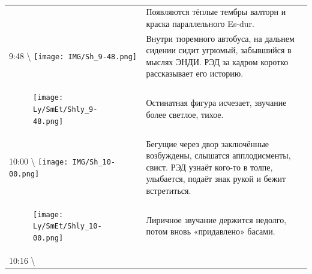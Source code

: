 \begin{longtable}[]{@{}ll@{}}
\begin{minipage}[t]{0.30\columnwidth}
\strut
\end{minipage} & \begin{minipage}[t]{0.64\columnwidth}\raggedright\strut
Появляются тёплые тембры валторн и краска параллельного
Es-dur.\strut
\end{minipage}\tabularnewline
\begin{minipage}[t]{0.30\columnwidth}\raggedright\strut
9:48 \textbackslash{}
\texttt{[image: IMG/Sh\_9-48.png]}\strut
\end{minipage} & \begin{minipage}[t]{0.64\columnwidth}\raggedright\strut
Внутри тюремного автобуса, на дальнем сидении сидит
угрюмый, забывшийся в мыслях ЭНДИ.
РЭД за кадром коротко рассказывает его историю.\strut
\end{minipage}\tabularnewline
\begin{minipage}[t]{0.30\columnwidth}\raggedright\strut
\begin{figure}
\centering
\texttt{[image: Ly/SmEt/Shly\_9-48.png]}
\caption{}
\end{figure}
\strut
\end{minipage} & \begin{minipage}[t]{0.64\columnwidth}\raggedright\strut
Остинатная фигура исчезает, звучание более светлое,
тихое.\strut
\end{minipage}\tabularnewline
\begin{minipage}[t]{0.30\columnwidth}\raggedright\strut
10:00 \textbackslash{}
\texttt{[image: IMG/Sh\_10-00.png]}\strut
\end{minipage} & \begin{minipage}[t]{0.64\columnwidth}\raggedright\strut
Бегущие через двор заключённые возбуждены, слышатся
апплодисменты, свист. РЭД узнаёт кого-то в толпе, улыбается,
подаёт знак рукой и бежит встретиться.\strut
\end{minipage}\tabularnewline
\begin{minipage}[t]{0.30\columnwidth}\raggedright\strut
\begin{figure}
\centering
\texttt{[image: Ly/SmEt/Shly\_10-00.png]}
\caption{}
\end{figure}
\strut
\end{minipage} & \begin{minipage}[t]{0.64\columnwidth}\raggedright\strut
Лиричное звучание держится недолго, потом вновь «придавлено»
басами.\strut
\end{minipage}\tabularnewline
\begin{minipage}[t]{0.48\columnwidth}\raggedright\strut
10:16 \textbackslash{}


\end{minipage}
\end{longtable}
